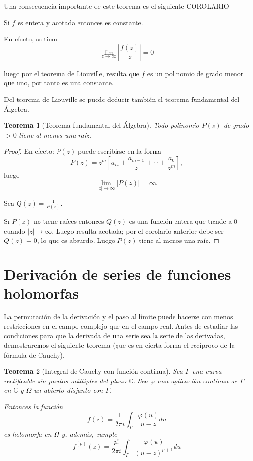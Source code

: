 \documentclass[10pt]{article}
\theoremstyle{plain}
\newtheorem{theorem}{Teorema}[section]
\theoremstyle{definition}
\theoremstyle{remark}
\begin{document}
Una consecuencia importante de este teorema es el siguiente COROLARIO

Si $f$ es entera y acotada entonces es constante.

En efecto, se tiene
$$\lim_{z \rightarrow \infty}\left|\frac{f(z)}{z}\right|=0$$


luego por el teorema de Liouville, resulta que $f$ es un polinomio de grado menor que uno, por tanto es una constante.

Del teorema de Liouville se puede deducir también el teorema fundamental del Álgebra.

\begin{theorem}[Teorema fundamental del Álgebra]
Todo polinomio $P(z)$ de grado $>0$ tiene al menos una raíz.
\end{theorem}

\begin{proof}
En efecto: $P(z)$ puede escribirse en la forma
$$P(z)=z^{m} \left[a_{m}+\frac{a_{m-1}}{z}+\cdots+\frac{a_{0}}{z^{m}}\right],$$
luego
$$\lim_{|z| \rightarrow \infty}|P(z)|=\infty.$$

Sea $Q(z)=\frac{1}{P(z)}$.

Si $P(z)$ no tiene raíces entonces $Q(z)$ es una función entera que tiende a 0 cuando $|z| \rightarrow \infty$. Luego resulta acotada; por el corolario anterior debe ser $Q(z)=0$, lo que es absurdo. Luego $P(z)$ tiene al menos una raíz.
\end{proof}

\section{Derivación de series de funciones holomorfas}

La permutación de la derivación y el paso al límite puede hacerse con menos restricciones en el campo complejo que en el campo real. Antes de estudiar las condiciones para que la derivada de una serie sea la serie de las derivadas, demostraremos el siguiente teorema (que es en cierta forma el recíproco de la fórmula de Cauchy).

\begin{theorem}[Integral de Cauchy con función continua]
Sea $\Gamma$ una curva rectificable sin puntos múltiples del plano $\mathbb{C}$. Sea $\varphi$ una aplicación continua de $\Gamma$ en $\mathbb{C}$ y $\Omega$ un abierto disjunto con $\Gamma$.

Entonces la función
\begin{equation*}
f(z)=\frac{1}{2 \pi i} \int_{\Gamma} \frac{\varphi(u)}{u-z} du \tag{14-1}
\end{equation*}
es holomorfa en $\Omega$ y, además, cumple
\begin{equation*}
f^{(p)}(z)=\frac{p!}{2 \pi i} \int_{\Gamma} \frac{\varphi(u)}{(u-z)^{p+1}} d u \tag{14-2}
\end{equation*}
\end{theorem}
\end{document}

